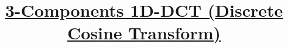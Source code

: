 
\title{\href{https://github.com/vicente-gonzalez-ruiz/DCT}{3-Components 1D-DCT (Discrete Cosine Transform)}}

\maketitle
